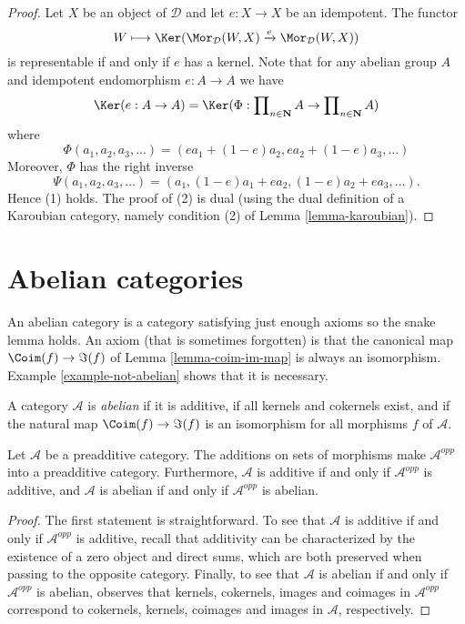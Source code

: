 \begin{proof}
Let $X$ be an object of $\mathcal{D}$ and let $e : X \to X$ be an idempotent.
The functor
$$
W \longmapsto \Ker(
\Mor_\mathcal{D}(W, X)
\xrightarrow{e}
\Mor_\mathcal{D}(W, X)
)
$$
is representable if and only if $e$ has a kernel. Note that for any
abelian group $A$ and idempotent endomorphism $e : A \to A$ we have
$$
\Ker(e : A \to A)
= \Ker(\Phi :
\prod\nolimits_{n \in \mathbf{N}} A
\to
\prod\nolimits_{n \in \mathbf{N}} A
)
$$
where
$$
\Phi(a_1, a_2, a_3, \ldots) = (ea_1 + (1 - e)a_2, ea_2 + (1 - e)a_3, \ldots)
$$
Moreover, $\Phi$ has the right inverse
$$
\Psi(a_1, a_2, a_3, \ldots) =
(a_1, (1 - e)a_1 + ea_2, (1 - e)a_2 + ea_3, \ldots).
$$
Hence (1) holds. The proof of (2) is dual (using the dual definition
of a Karoubian category, namely condition (2) of
Lemma \ref{lemma-karoubian}).
\end{proof}









\section{Abelian categories}
\label{section-abelian-categories}

\noindent
An abelian category is a category satisfying just enough axioms so the
snake lemma holds. An axiom (that is sometimes forgotten)
is that the canonical map $\Coim(f) \to \Im(f)$
of Lemma \ref{lemma-coim-im-map} is always an isomorphism.
Example \ref{example-not-abelian} shows that it is necessary.

\begin{definition}
\label{definition-abelian-category}
A category $\mathcal{A}$ is {\it abelian} if
it is additive, if all kernels and cokernels exist,
and if the natural map $\Coim(f) \to \Im(f)$
is an isomorphism for all morphisms $f$ of
$\mathcal{A}$.
\end{definition}

\begin{lemma}
\label{lemma-abelian-opposite}
Let $\mathcal{A}$ be a preadditive category.
The additions on sets of morphisms make
$\mathcal{A}^{opp}$ into a preadditive category.
Furthermore, $\mathcal{A}$ is additive if and only if $\mathcal{A}^{opp}$
is additive, and
$\mathcal{A}$ is abelian if and only if $\mathcal{A}^{opp}$ is abelian.
\end{lemma}

\begin{proof}
The first statement is straightforward.
To see that $\mathcal{A}$ is additive if and only if $\mathcal{A}^{opp}$
is additive, recall that additivity can be characterized by
the existence of a zero object and direct sums, which are both
preserved when passing to the opposite category.
Finally, to see that
$\mathcal{A}$ is abelian if and only if $\mathcal{A}^{opp}$ is abelian,
observes that kernels, cokernels, images and coimages in
$\mathcal{A}^{opp}$ correspond to
cokernels, kernels, coimages and images in $\mathcal{A}$,
respectively.
\end{proof}

